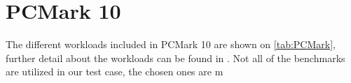 \section{PCMark 10}
The different workloads included in PCMark 10 are shown on \cref{tab:PCMark}, further detail about the workloads can be found in \cite{pcmark}. Not all of the benchmarks are utilized in our test case, the chosen ones are m

